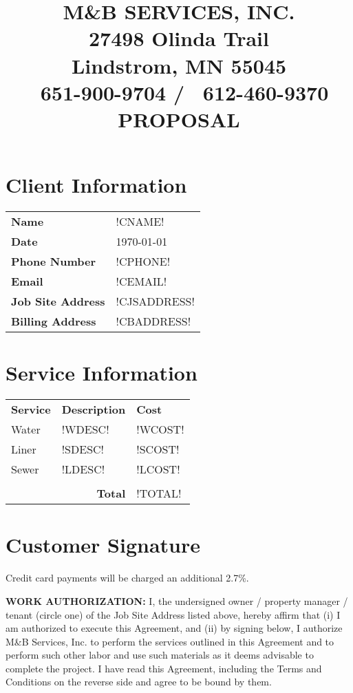 \documentclass{article}
\title{\textbf{M\&B SERVICES, INC.}\\
    \large 27498 Olinda Trail \\
    Lindstrom, MN 55045 \\
    \Telefon\ 651-900-9704 / \fax\ 612-460-9370 \\
    \hfill \break 
    \textbf{PROPOSAL}}
\author{}
\date{}
\begin{document}
\maketitle

\vspace{-2cm}

\section*{Client Information}

\begin{tabularx}{\textwidth}{p{100px} X}
    \textbf{Name} & !CNAME! \\
    \textbf{Date} & \today \\
    \textbf{Phone Number} & !CPHONE! \\
    \textbf{Email} & !CEMAIL! \\
    \textbf{Job Site Address} & !CJSADDRESS! \\
    \textbf{Billing Address} & !CBADDRESS! \\
\end{tabularx}

\section*{Service Information}

\begin{tabularx}{\textwidth}{p{100px} X p{50px}}
    \textbf{Service} & \textbf{Description} & \textbf{Cost} \\
     Water & !WDESC! & !WCOST! \\
     Liner & !SDESC! & !SCOST! \\
     Sewer & !LDESC! & !LCOST! \\
     \hline \\
     \multicolumn{2}{r}{\textbf{Total}} & !TOTAL! \\
\end{tabularx}

\section*{Customer Signature}
Credit card payments will be charged an additional 2.7\%.\newline

\noindent \textbf{WORK AUTHORIZATION:} I, the undersigned owner / property manager / tenant (circle one) of the Job Site Address listed above, hereby affirm that (i) I am authorized to execute this Agreement, and (ii) by signing below, I authorize M\&B Services, Inc. to perform the services outlined in this Agreement and to perform such other labor and use such materials as it deems advisable to complete the project. I have read this Agreement, including the Terms and Conditions on the reverse side and agree to be bound by them.\\
\end{document}
